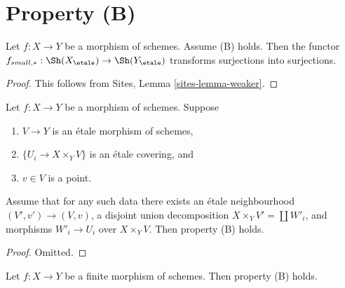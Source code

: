 \section{Property (B)}
\label{section-B}

\begin{lemma}
\label{lemma-property-B-implies}
Let $f : X \to Y$ be a morphism of schemes. Assume (B) holds.
Then the functor
$f_{small, *} :
\Sh(X_\etale)
\to
\Sh(Y_\etale)$
transforms surjections into surjections.
\end{lemma}

\begin{proof}
This follows from
Sites, Lemma \ref{sites-lemma-weaker}.
\end{proof}

\begin{lemma}
\label{lemma-simplify-B}
Let $f : X \to Y$ be a morphism of schemes. Suppose
\begin{enumerate}
\item $V \to Y$ is an \'etale morphism of schemes,
\item $\{U_i \to X \times_Y V\}$ is an \'etale covering, and
\item $v \in V$ is a point.
\end{enumerate}
Assume that for any such data there exists an \'etale neighbourhood
$(V', v') \to (V, v)$, a disjoint union decomposition
$X \times_Y V' = \coprod W'_i$, and morphisms $W'_i \to U_i$
over $X \times_Y V$. Then property (B) holds.
\end{lemma}

\begin{proof}
Omitted.
\end{proof}

\begin{lemma}
\label{lemma-finite-B}
Let $f : X \to Y$ be a finite morphism of schemes.
Then property (B) holds.
\end{lemma}

